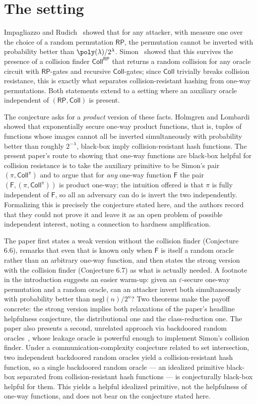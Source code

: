 \documentclass{conjura-conjecture}
\newcommand{\Fo}{\mathsf{F}}          %
\newcommand{\RP}{\mathsf{RP}}
\newcommand{\Coll}{\mathsf{Coll}}
\newcommand{\negl}{\mathrm{negl}}
\begin{document}
\section{The setting}\label{sec:setting}

Impagliazzo and Rudich~\cite{IR89} showed that for any attacker, with
measure one over the choice of a random permutation $\RP$, the permutation
cannot be inverted with probability better than
$\poly(\lambda)/2^{\lambda}$. Simon~\cite{Sim98} showed that this survives
the presence of a collision finder $\Coll^{\RP}$ that returns a random
collision for any oracle circuit with $\RP$-gates and recursive
$\Coll$-gates; since $\Coll$ trivially breaks collision resistance, this is
exactly what separates collision-resistant hashing from one-way
permutations. Both statements extend to a setting where an auxiliary oracle
independent of $(\RP,\Coll)$ is present.

The conjecture asks for a \emph{product} version of these facts. Holmgren
and Lombardi~\cite{HL18} showed that exponentially secure one-way product
functions, that is, tuples of functions whose images cannot all be inverted
simultaneously with probability better than roughly $2^{-\lambda}$,
black-box imply collision-resistant hash functions. The present paper's
route to showing that one-way functions are black-box helpful for collision
resistance is to take the auxiliary primitive to be Simon's pair
$(\pi,\Coll^{\pi})$ and to argue that for \emph{any} one-way function
$\Fo$ the pair $(\Fo,(\pi,\Coll^{\pi}))$ is product one-way; the intuition
offered is that $\pi$ is fully independent of $\Fo$, so all an adversary
can do is invert the two independently. Formalizing this is precisely the
conjecture stated here, and the authors record that they could not prove it
and leave it as an open problem of possible independent interest, noting a
connection to hardness amplification.

The paper first states a weak version without the collision finder
(Conjecture 6.6), remarks that even that is known only when $\Fo$ is itself
a random oracle rather than an arbitrary one-way function, and then states
the strong version with the collision finder (Conjecture 6.7) as what is
actually needed. A footnote in the introduction suggests an easier warm-up:
given an $\varepsilon$-secure one-way permutation and a random oracle, can
an attacker invert both simultaneously with probability better than
$\negl(n)/2^{n}$? Two theorems make the payoff concrete: the strong version
implies both relaxations of the paper's headline helpfulness conjecture,
the distributional one and the class-reduction one. The paper also presents
a second, unrelated approach via backdoored random oracles~\cite{BFM18},
whose leakage oracle is powerful enough to implement Simon's collision
finder. Under a communication-complexity conjecture related to set
intersection, two independent backdoored random oracles yield a
collision-resistant hash function, so a single backdoored random oracle
--- an idealized primitive black-box separated from collision-resistant
hash functions --- is conjecturally black-box helpful for them. This yields
a helpful idealized primitive, not the helpfulness of one-way functions,
and does not bear on the conjecture stated here.
\end{document}
